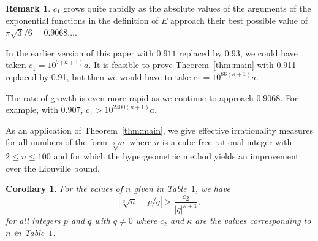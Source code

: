 \documentclass{jT}
\newtheorem{corollary}[theorem]{Corollary}
\theoremstyle{definition}
\newtheorem*{remark}{Remark}
\begin{document}
\begin{remark}
$c_{1}$ grows quite rapidly as the absolute values of the arguments of
the exponential functions in the definition of $E$ approach their best possible value
of $\pi \sqrt{3}/6=0.9068\ldots$.

In the earlier version of this paper with $0.911$ replaced by $0.93$, we could have
taken $c_{1}=10^{7(\kappa+1)} a$. It is feasible to prove Theorem~\ref{thm:main} with
0.911 replaced by 0.91, but then we would have to take $c_{1}=10^{86(\kappa+1)} a$.

The rate of growth is even more rapid as we continue to approach $0.9068$. For example,
with $0.907$, $c_{1} > 10^{2400(\kappa+1)} a$.
\end{remark}

As an application of Theorem~\ref{thm:main}, we give effective 
irrationality measures for all numbers of the form 
$\sqrt[3]{n}$ where $n$ is a cube-free rational integer  
with $2 \leq n \leq 100$ and for which the hypergeometric 
method yields an improvement over the Liouville bound. 

\begin{corollary}
\label{cor:main}
For the values of $n$ given in Table~$1$, we have 
\begin{displaymath}
\left| \sqrt[3]{n} - p/q \right| 
> \frac{c_{2}}{|q|^{\kappa+1}},  
\end{displaymath}
for all integers $p$ and $q$ with $q \neq 0$ where $c_{2}$ 
and $\kappa$ are the values corresponding to $n$ in Table~$1$. 
\end{corollary}
\end{document}
